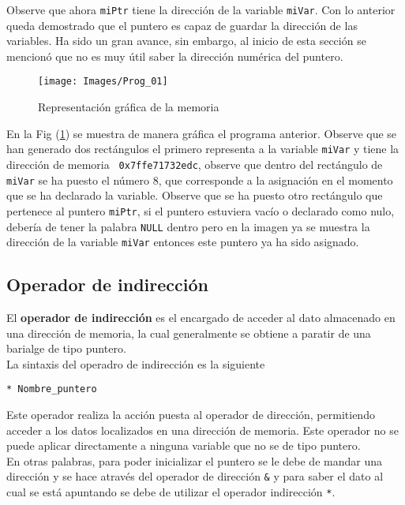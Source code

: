 \documentclass[12pt]{extarticle}
\newcommand{\<}{\langle}
\renewcommand{\>}{\rangle}
\theoremstyle{definition}
\begin{document}
Observe que ahora \verb|miPtr| tiene la dirección de la variable \verb|miVar|. Con lo anterior queda demostrado que el puntero es capaz de guardar la dirección de las variables. Ha sido un gran avance, sin embargo, al inicio de esta sección se mencionó que no es muy útil saber la dirección numérica del puntero. 

\begin{figure}[thpb]
	\centering
	\texttt{[image: Images/Prog\_01]}      
	\caption{Representación gráfica de la memoria }
	\label{Fig::Prog_01}
\end{figure}

En la Fig (\ref{Fig::Prog_01}) se muestra de manera gráfica el programa anterior. Observe que se han generado dos rectángulos el primero representa a la variable \verb|miVar| y tiene la dirección de memoria \verb| 0x7ffe71732edc|, observe que dentro del rectángulo de \verb|miVar| se ha puesto el número 8, que corresponde a la asignación en el momento que se ha declarado la variable. Observe que se ha puesto otro rectángulo que pertenece al puntero \verb|miPtr|, si el puntero estuviera vacío o declarado como nulo, debería de tener la palabra \verb|NULL| dentro pero en la imagen ya se muestra la dirección de la variable \verb|miVar| entonces este puntero ya ha sido asignado.


\subsection{Operador de indirección}
El \textbf{operador de indirección}  es el encargado de acceder al dato almacenado en una dirección de memoria, la cual generalmente se obtiene a paratir de una barialge de tipo puntero.\\

La sintaxis del operadro de indirección es la siguiente
\begin{lstlisting}
* Nombre_puntero
\end{lstlisting}

Este operador realiza la acción puesta al operador de dirección, permitiendo acceder a los datos localizados en una dirección de memoria. Este operador no se puede aplicar directamente a ninguna variable que no se de tipo puntero.\\

En otras palabras, para poder inicializar el puntero se le debe de mandar una dirección y se hace através del operador de dirección \verb|&| y para saber el dato al cual se está apuntando se debe de utilizar el operador indirección \verb|*|.\\
\end{document}
